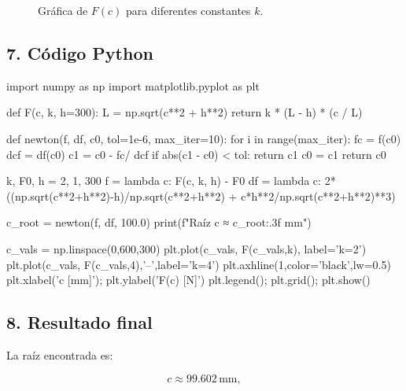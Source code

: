 \documentclass[12pt]{article}
\begin{document}
\begin{figure}[H]
\centering
{}
\caption{Gráfica de \(F(c)\) para diferentes constantes \(k\).}
\end{figure}

\subsection*{7. Código Python}

\begin{tcolorbox}[breakable, listing only, listing options={style=mypython}, colback=white, colframe=black]
import numpy as np
import matplotlib.pyplot as plt

def F(c, k, h=300):
    L = np.sqrt(c**2 + h**2)
    return k * (L - h) * (c / L)

def newton(f, df, c0, tol=1e-6, max_iter=10):
    for i in range(max_iter):
        fc = f(c0)
        dcf = df(c0)
        c1 = c0 - fc/ dcf
        if abs(c1 - c0) < tol:
            return c1
        c0 = c1
    return c0

k, F0, h = 2, 1, 300
f  = lambda c: F(c, k, h) - F0
df = lambda c: 2*((np.sqrt(c**2+h**2)-h)/np.sqrt(c**2+h**2)
                 + c*h**2/np.sqrt(c**2+h**2)**3)

c_root = newton(f, df, 100.0)
print(f"Raíz c ≈ {c_root:.3f} mm")

c_vals = np.linspace(0,600,300)
plt.plot(c_vals, F(c_vals,k), label='k=2')
plt.plot(c_vals, F(c_vals,4),'--',label='k=4')
plt.axhline(1,color='black',lw=0.5)
plt.xlabel('c [mm]'); plt.ylabel('F(c) [N]')
plt.legend(); plt.grid(); plt.show()
\end{tcolorbox}

\subsection*{8. Resultado final}

La raíz encontrada es:

\[
\boxed{c \approx 99.602\,\mathrm{mm}},
\]
\end{document}
